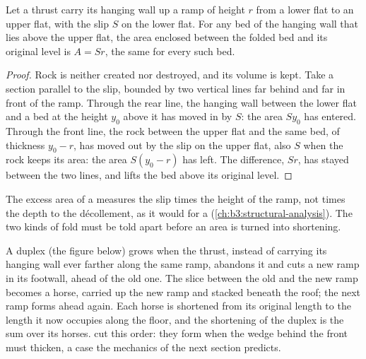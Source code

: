 \begin{omfigure}
\par{}\label{fig:b3:orogenic-wedges:thrusts}
\end{omfigure}


\begin{proposition}\label{prop:b3:orogenic-wedges:fault-bend-area}
Let a thrust carry its hanging wall up a ramp of height $r$ from a lower flat
to an upper flat, with the slip $S$ on the lower flat. For any bed of the
hanging wall that lies above the upper flat, the area enclosed between the
folded bed and its original level is $A = Sr$, the same for every such bed.
\end{proposition}

\begin{proof}
Rock is neither created nor destroyed, and its volume is kept. Take a section
parallel to the slip, bounded by two vertical lines far behind and far in
front of the ramp. Through the rear line, the hanging wall between the lower
flat and a bed at the height $y_0$ above it has moved in by $S$: the area
$Sy_0$ has entered. Through the front line, the rock between the upper flat
and the same bed, of thickness $y_0 - r$, has moved out by the slip on the
upper flat, also $S$ when the rock keeps its area: the area $S(y_0 - r)$
has left. The difference, $Sr$, has stayed between the two lines, and lifts
the bed above its original level.
\end{proof}

The excess area of a  measures the slip times the height of
the ramp, not times the depth to the décollement, as it would for a
 (\cref{ch:b3:structural-analysis}). The two kinds of fold
must be told apart before an area is turned into shortening.


A duplex (the figure below) grows when the thrust, instead of carrying its hanging wall ever
farther along the same ramp, abandons it and cuts a new ramp in its footwall,
ahead of the old one. The slice between the old and the new ramp becomes a
horse, carried up the new ramp and stacked beneath the roof; the next ramp
forms ahead again. Each horse is shortened from its original length to the
length it now occupies along the floor, and the shortening of the duplex is
the sum over its horses.  cut this order: they form
when the wedge behind the front must thicken, a case the mechanics of the
next section predicts.

